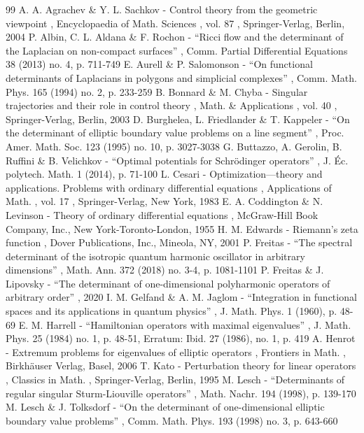 \documentclass[11pt]{article}
\theoremstyle{plain}
\theoremstyle{definition}
\begin{document}
\begin{thebibliography}{99}
 A. A. Agrachev \& Y. L. Sachkov - Control theory from the geometric viewpoint , Encyclopaedia of Math. Sciences , vol. 87 , Springer-Verlag, Berlin, 2004
 P. Albin, C. L. Aldana \& F. Rochon - “Ricci flow and the determinant of the Laplacian on non-compact surfaces” , Comm. Partial Differential Equations 38 (2013) no. 4, p. 711-749
 E. Aurell \& P. Salomonson - “On functional determinants of Laplacians in polygons and simplicial complexes” , Comm. Math. Phys. 165 (1994) no. 2, p. 233-259
 B. Bonnard \& M. Chyba - Singular trajectories and their role in control theory , Math. \& Applications , vol. 40 , Springer-Verlag, Berlin, 2003
 D. Burghelea, L. Friedlander \& T. Kappeler - “On the determinant of elliptic boundary value problems on a line segment” , Proc. Amer. Math. Soc. 123 (1995) no. 10, p. 3027-3038
 G. Buttazzo, A. Gerolin, B. Ruffini \& B. Velichkov - “Optimal potentials for Schrödinger operators” , J. Éc. polytech. Math. 1 (2014), p. 71-100
 L. Cesari - Optimization—theory and applications. Problems with ordinary differential equations , Applications of Math. , vol. 17 , Springer-Verlag, New York, 1983
 E. A. Coddington \& N. Levinson - Theory of ordinary differential equations , McGraw-Hill Book Company, Inc., New York-Toronto-London, 1955
 H. M. Edwards - Riemann’s zeta function , Dover Publications, Inc., Mineola, NY, 2001
 P. Freitas - “The spectral determinant of the isotropic quantum harmonic oscillator in arbitrary dimensions” , Math. Ann. 372 (2018) no. 3-4, p. 1081-1101
 P. Freitas \& J. Lipovsky - “The determinant of one-dimensional polyharmonic operators of arbitrary order” , 2020
 I. M. Gelfand \& A. M. Jaglom - “Integration in functional spaces and its applications in quantum physics” , J. Math. Phys. 1 (1960), p. 48-69
 E. M. Harrell - “Hamiltonian operators with maximal eigenvalues” , J. Math. Phys. 25 (1984) no. 1, p. 48-51, Erratum: Ibid. 27 (1986), no. 1, p. 419
 A. Henrot - Extremum problems for eigenvalues of elliptic operators , Frontiers in Math. , Birkhäuser Verlag, Basel, 2006
 T. Kato - Perturbation theory for linear operators , Classics in Math. , Springer-Verlag, Berlin, 1995
 M. Lesch - “Determinants of regular singular Sturm-Liouville operators” , Math. Nachr. 194 (1998), p. 139-170
 M. Lesch \& J. Tolksdorf - “On the determinant of one-dimensional elliptic boundary value problems” , Comm. Math. Phys. 193 (1998) no. 3, p. 643-660

\end{thebibliography}
\end{document}
